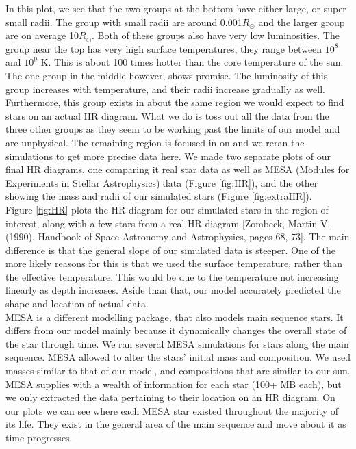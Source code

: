 \documentclass[10pt]{article}
\begin{document}
In this plot, we see that the two groups at the bottom have either large, or super small  radii. The group with small radii are around 0.001$R_\odot$ and the larger group are on average 10$R_\odot$. Both of these groups also have very low luminosities. The group near the top has very high surface temperatures, they range between $10^8$ and $10^9$ K. This is about 100 times hotter than the core temperature of the sun. The one group in the middle however, shows promise. The luminosity of this group increases with temperature, and their radii increase gradually as well. Furthermore, this group exists in about the same region we would expect to find stars on an actual HR diagram. What we do is toss out all the data from the three other groups as they seem to be working past the limits of our model and are unphysical. The remaining region is focused in on and we reran the simulations to get more precise data here. We made two separate plots of our final HR diagrams, one comparing it real star data as well as MESA (Modules for Experiments in Stellar Astrophysics) data (Figure \ref{fig:HR}), and the other showing the mass and radii of our simulated stars (Figure \ref{fig:extraHR}). \\

Figure \ref{fig:HR} plots the HR diagram for our simulated stars in the region of interest, along with a few stars from a real HR diagram [Zombeck, Martin V. (1990). Handbook of Space Astronomy and Astrophysics, pages 68, 73]. The main difference is that the general slope of our simulated data is steeper. One of the more likely reasons for this is that we used the surface temperature, rather than the effective temperature. This would be due to the temperature not increasing linearly as depth increases. Aside than that, our model accurately predicted the shape and location of actual data. \\

MESA is a different modelling package, that also models main sequence stars. It differs from our model mainly because it dynamically changes the overall state of the star through time. We ran several MESA simulations for stars along the main sequence. MESA allowed to alter the stars' initial mass and composition. We used masses similar to that of our model, and compositions that are similar to our sun. MESA supplies with a wealth of information for each star (100+ MB each), but we only extracted the data pertaining to their location on an HR diagram. On our plots we can see where each MESA star existed throughout the majority of its life. They exist in the general area of the main sequence and move about it as time progresses. \\
\end{document}
